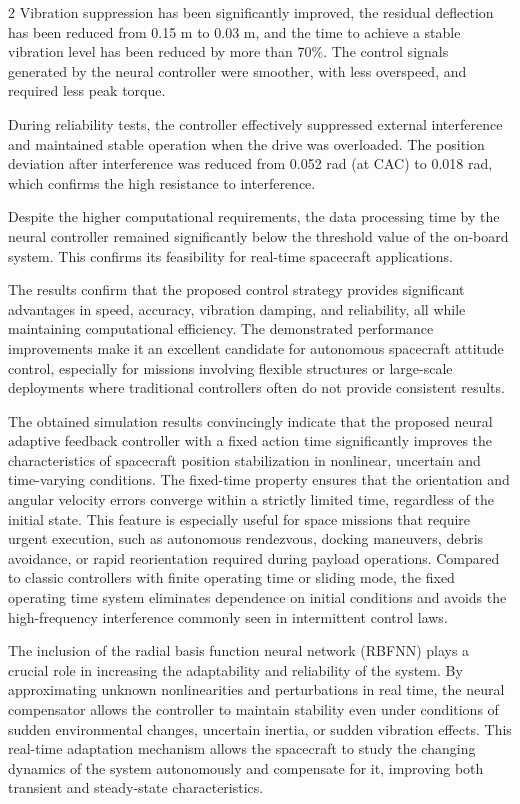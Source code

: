\begin{multicols}{2}
Vibration suppression has been significantly improved, the residual
deflection has been reduced from 0.15 m to 0.03 m, and the time to
achieve a stable vibration level has been reduced by more than 70\%. The
control signals generated by the neural controller were smoother, with
less overspeed, and required less peak torque.

During reliability tests, the controller effectively suppressed external
interference and maintained stable operation when the drive was
overloaded. The position deviation after interference was reduced from
0.052 rad (at CAC) to 0.018 rad, which confirms the high resistance to
interference.

Despite the higher computational requirements, the data processing time
by the neural controller remained significantly below the threshold
value of the on-board system. This confirms its feasibility for
real-time spacecraft applications.

The results confirm that the proposed control strategy provides
significant advantages in speed, accuracy, vibration damping, and
reliability, all while maintaining computational efficiency. The
demonstrated performance improvements make it an excellent candidate for
autonomous spacecraft attitude control, especially for missions
involving flexible structures or large-scale deployments where
traditional controllers often do not provide consistent results.

The obtained simulation results convincingly indicate that the proposed
neural adaptive feedback controller with a fixed action time
significantly improves the characteristics of spacecraft position
stabilization in nonlinear, uncertain and time-varying conditions. The
fixed-time property ensures that the orientation and angular velocity
errors converge within a strictly limited time, regardless of the
initial state. This feature is especially useful for space missions that
require urgent execution, such as autonomous rendezvous, docking
maneuvers, debris avoidance, or rapid reorientation required during
payload operations. Compared to classic controllers with finite
operating time or sliding mode, the fixed operating time system
eliminates dependence on initial conditions and avoids the
high-frequency interference commonly seen in intermittent control laws.

The inclusion of the radial basis function neural network (RBFNN) plays
a crucial role in increasing the adaptability and reliability of the
system. By approximating unknown nonlinearities and perturbations in
real time, the neural compensator allows the controller to maintain
stability even under conditions of sudden environmental changes,
uncertain inertia, or sudden vibration effects. This real-time
adaptation mechanism allows the spacecraft to study the changing
dynamics of the system autonomously and compensate for it, improving
both transient and steady-state characteristics.


\end{multicols}
